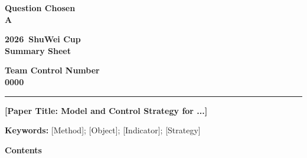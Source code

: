 \documentclass[a4paper,12pt]{article}
\newcommand{\ContestYear}{2026}
\newcommand{\ContestName}{ShuWei Cup}   %
\newcommand{\TeamNumber}{0000}
\newcommand{\ProblemChosen}{A}
\newcommand{\PaperTitle}{[Paper Title: Model and Control Strategy for ...]}
\newcommand{\KeywordsText}{[Method]; [Object]; [Indicator]; [Strategy]}
\newcommand{\SummaryText}{}
\begin{document}
\thispagestyle{empty}
\vspace*{-1.2em}
\noindent
\begin{minipage}[t]{0.29\textwidth}\centering
  \textbf{Question Chosen}\\[0.5em]
  {\fontsize{20pt}{22pt}\selectfont\bfseries\textcolor{red!75!black}{\ProblemChosen}}
\end{minipage}%
\begin{minipage}[t]{0.40\textwidth}\centering
  \textbf{\ContestYear\ \ContestName}\\[0.25em]
  \textbf{Summary Sheet}
\end{minipage}%
\begin{minipage}[t]{0.29\textwidth}\centering
  \textbf{Team Control Number}\\[0.5em]
  {\fontsize{16pt}{18pt}\selectfont\bfseries\textcolor{red!75!black}{\TeamNumber}}
\end{minipage}
\vspace{0.9em}

\noindent\rule{\textwidth}{0.8pt}
\vspace{1.6em}

\begin{center}
  {\fontsize{16pt}{19pt}\selectfont\bfseries \PaperTitle}
\end{center}
\vspace{1.2em}

\SummaryText

\vspace{0.8em}
\noindent\textbf{Keywords:} \KeywordsText
\newpage

\setcounter{page}{1}
\setcounter{tocdepth}{1}
\thispagestyle{empty}
\begin{center}{\fontsize{16pt}{19pt}\selectfont\bfseries Contents}\end{center}
\vspace{1.2em}
\renewcommand{\contentsname}{}
\tableofcontents
\newpage
\end{document}
